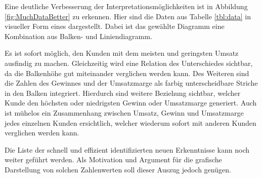 Eine deutliche Verbesserung der Interpretationsmöglichkeiten ist in Abbildung \ref{fig:MuchDataBetter} zu erkennen.
Hier sind die Daten aus Tabelle \ref{tbl:data} in visueller Form eines dargestellt.
Dabei ist das gewählte Diagramm eine Kombination aus Balken- und Liniendiagramm.

Es ist sofort möglich, den Kunden mit dem meisten und geringsten Umsatz ausfindig zu machen.
Gleichzeitig wird eine Relation des Unterschiedes sichtbar, da die Balkenhöhe gut miteinander verglichen werden kann.
Des Weiteren sind die Zahlen des Gewinnes und der Umsatzmarge als farbig unterscheidbare Striche in den Balken integriert.
Hierdurch sind weitere Beziehung sichtbar, welcher Kunde den höchsten oder niedrigsten Gewinn oder Umsatzmarge generiert.
Auch ist mühelos ein Zusammenhang zwischen Umsatz, Gewinn und Umsatzmarge jedes einzelnen Kunden ersichtlich, welcher wiederum sofort mit anderen Kunden verglichen werden kann.

Die Liste der schnell und effizient identifizierten neuen Erkenntnisse kann noch weiter geführt werden.
Als Motivation und Argument für die grafische Darstellung von solchen Zahlenwerten soll dieser Auszug jedoch genügen.

